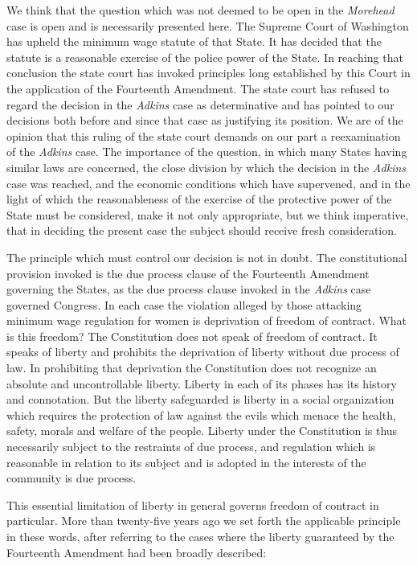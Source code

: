 \documentclass[
  letterpaper,
  11pt,
  DIV=9,
  openright]{scrbook}
\begin{document}
We think that the question which was not deemed to be open in the
\emph{Morehead} case is open and is necessarily presented here. The
Supreme Court of Washington has upheld the minimum wage statute of that
State. It has decided that the statute is a reasonable exercise of the
police power of the State. In reaching that conclusion the state court
has invoked principles long established by this Court in the application
of the Fourteenth Amendment. The state court has refused to regard the
decision in the \emph{Adkins} case as determinative and has pointed to
our decisions both before and since that case as justifying its
position. We are of the opinion that this ruling of the state court
demands on our part a reexamination of the \emph{Adkins} case. The
importance of the question, in which many States having similar laws are
concerned, the close division by which the decision in the \emph{Adkins}
case was reached, and the economic conditions which have supervened, and
in the light of which the reasonableness of the exercise of the
protective power of the State must be considered, make it not only
appropriate, but we think imperative, that in deciding the present case
the subject should receive fresh consideration.

The principle which must control our decision is not in doubt. The
constitutional provision invoked is the due process clause of the
Fourteenth Amendment governing the States, as the due process clause
invoked in the \emph{Adkins} case governed Congress. In each case the
violation alleged by those attacking minimum wage regulation for women
is deprivation of freedom of contract. What is this freedom? The
Constitution does not speak of freedom of contract. It speaks of liberty
and prohibits the deprivation of liberty without due process of law. In
prohibiting that deprivation the Constitution does not recognize an
absolute and uncontrollable liberty. Liberty in each of its phases has
its history and connotation. But the liberty safeguarded is liberty in a
social organization which requires the protection of law against the
evils which menace the health, safety, morals and welfare of the people.
Liberty under the Constitution is thus necessarily subject to the
restraints of due process, and regulation which is reasonable in
relation to its subject and is adopted in the interests of the community
is due process.

This essential limitation of liberty in general governs freedom of
contract in particular. More than twenty-five years ago we set forth the
applicable principle in these words, after referring to the cases where
the liberty guaranteed by the Fourteenth Amendment had been broadly
described:
\end{document}
